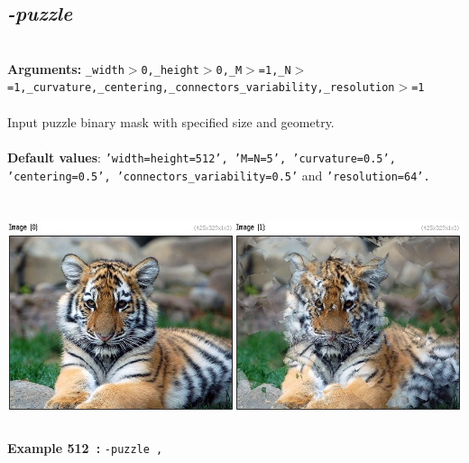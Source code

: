 \documentclass[a4paper,11pt,twoside]{book}
\begin{document}
\subsection{\emph{-puzzle} }\vspace*{-0.5em}
~\\\textbf{Arguments: } 
{\small \texttt{\_width$>$0,\_height$>$0,\_M$>$=1,\_N$>$=1,\_curvature,\_centering,\_connectors\_variability,\_resolution$>$=1}}\\~\\
Input puzzle binary mask with specified size and geometry.
~\\~\\\textbf{Default values}: {\small \texttt{'width=height=512', 'M=N=5', 'curvature=0.5', 'centering=0.5', 'connectors\_variability=0.5'} and \texttt{'resolution=64'.}}
\begin{center}\includegraphics[keepaspectratio=true,height=7cm,width=\textwidth]{img/gmic_def512.jpg}\\
{\footnotesize \textbf{Example 512~:} \texttt{-puzzle ,}}
\end{center}
\end{document}
